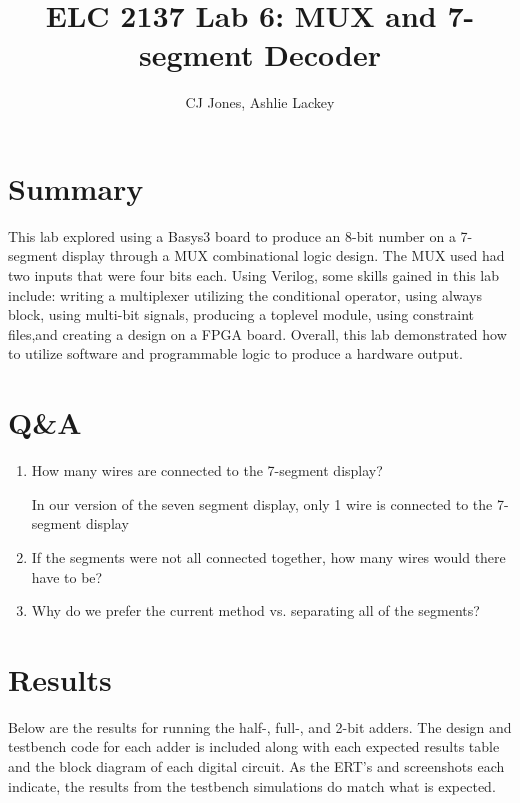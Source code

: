 \documentclass[11pt]{article}
\begin{document}
\title{ELC 2137 Lab 6: MUX and 7-segment Decoder}
\author{CJ Jones, Ashlie Lackey}

\maketitle


\section*{Summary}

This lab explored using a Basys3 board to produce an 8-bit number on a 7-segment display through a MUX combinational logic design. The MUX used had two inputs that were four bits each. Using Verilog, some skills gained in this lab include: writing a multiplexer utilizing the conditional operator, using always block, using multi-bit signals, producing a toplevel module, using constraint files,and creating a design on a FPGA board. Overall, this lab demonstrated how to utilize software and programmable logic to produce a hardware output.


\section*{Q\&A}

\begin{enumerate}
	\item How many wires are connected to the 7-segment display?
	
	In our version of the seven segment display, only 1 wire is connected to the 7-segment display
	
	\item   If the segments were not all connected together, how many wires would there have to be?
	
	\item Why do we prefer the current method vs. separating all of the segments?
	
\end{enumerate}




\section*{Results}

Below are the results for running the half-, full-, and 2-bit adders. The design and testbench code for each adder is included along with each expected results table and the block diagram of each digital circuit. As the ERT's and screenshots each indicate, the results from the testbench simulations do match what is expected.
\end{document}
